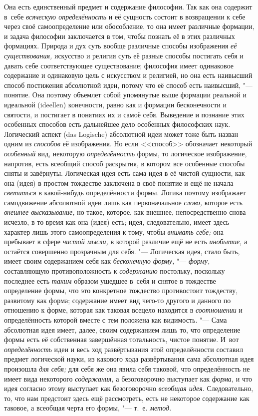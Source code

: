 Она есть единственный предмет и содержание философии. Так как
она содержит в~себе {\em всяческую
определённость} и её сущность состоит в возвращении к себе
через своё самоопределение или обособление, то она имеет различные
формации, и задача философии заключается в том, чтобы познать её в этих
различных формациях. Природа и дух суть вообще различные способы
изображения {\em её существования,}
искусство и религия суть её разные способы постигать себя и
давать себе соответствующее существование; философия имеет одинаковое
содержание и одинаковую цель с искусством и религией, но она
есть наивысший способ постижения абсолютной идеи, потому что её способ есть
наивысший, "--- понятие. Она поэтому объемлет собой упомянутые
выше формации реальной и идеальной (ideellen) конечности,
равно как и формации бесконечности и святости, и постигает в понятиях их и
самоё себя. Выведение и познание этих особенных способов есть дальнейшее
дело особенных философских наук. Логический аспект (das Logische)
абсолютной идеи может тоже быть назван одним из
{\em способов} её
изображения. Но если <<способ>> обозначает некоторый
{\em особенный} вид,
некоторую {\em определённость}
формы, то логическое изображение, напротив, есть всеобщий
способ раскрытия, в котором все особенные способы сняты и завёрнуты.
Логическая идея есть сама идея в её чистой сущности, как она (идея) в
простом тождестве заключена в своё понятие и ещё не начала
{\em светиться} в
какой-нибудь определённости формы. Логика поэтому изображает самодвижение
абсолютной идеи лишь как первоначальное
{\em слово,} которое есть
{\em внешнее высказывание,}
но такое, которое, как внешнее, непосредственно снова
исчезло, в то время как она (идея) есть; идея, следовательно, имеет здесь
характер лишь этого самоопределения к тому, чтобы
{\em внимать себе;} она
пребывает в сфере {\em чистой мысли,}
в которой различие ещё не есть
{\em инобытие,} а
остаётся совершенно прозрачным для себя. "--- Логическая идея,
стало быть, имеет своим содержанием себя как
{\em бесконечную форму,} "---
{\em форму,} составляющую
противоположность к {\em содержанию}
постольку, поскольку последнее есть
{\em таким} образом
ушедшее в~себя и снятое в тождестве определение формы, что это конкретное
тождество противостоит тождеству, развитому как форма; содержание имеет вид
чего-то другого и данного по отношению к форме, которая как таковая всецело
находится в {\em соотношении}
и определённость которой вместе с тем положена как
видимость. "--- Сама абсолютная идея имеет, далее, своим
содержанием лишь то, что определение формы есть её собственная завершённая
тотальность, чистое понятие. И~вот
{\em определённость} идеи
и весь ход развёртывания этой определённости составил предмет логической
науки, из какового хода развёртывания сама абсолютная идея произошла
{\em для себя;} для себя
же она явила себя таковой, что определённость не имеет вида некоторого
{\em содержания,} а
безоговорочно выступает как
{\em форма,} и что идея
согласно этому выступает как безоговорочно
{\em всеобщая идея}.
Следовательно, то, что нам предстоит здесь ещё рассмотреть,
есть не некоторое содержание как таковое, а всеобщая черта его формы, "---
т.~е. {\em метод}.

